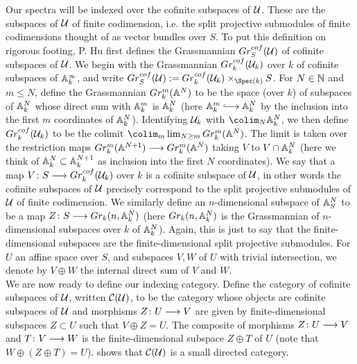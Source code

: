\documentclass{amsart}
\theoremstyle{definition}
\begin{document}
Our spectra will be indexed over the cofinite subspaces of ${\mathcal{U}}$. These are the subspaces of ${\mathcal{U}}$ of finite codimension, i.e. the split projective submodules of finite codimensions thought of as vector bundles over $S$. To put this definition on rigorous footing, P. Hu first defines the Grassmannian $Gr_{S}^{cof}({\mathcal{U}})$ of cofinite subspaces of ${\mathcal{U}}$. We begin with the Grassmannian $Gr_{k}^{cof}({\mathcal{U}}_{k})$ over $k$ of cofinite subspaces of $\mathbb{A}^{\infty}_{k}$, and write $Gr_{S}^{cof}(\oU) := Gr_{k}^{cof}(\oU_{k}) \times_{\Spec(k)} S$. For $N \in \mathbb{N}$ and $m \leq N$, define the Grassmannian $Gr_{k}^{m}(\mathbb{A}^N)$ to be the space (over $k$) of subspaces of $\mathbb{A}^N_k$ whose direct sum with $\mathbb{A}^m_k$ is $\mathbb{A}^N_k$ (here $\bA^m_k \monoto \bA^N_k$ by the inclusion into the first $m$ coordinates of $\mathbb{A}^N_k$). Identifying ${\mathcal{U}}_{k}$ with $\colim_N \bA^N_k$, we then define $Gr_{k}^{cof}({\mathcal{U}}_{k})$ to be the colimit $\colim_m \lim_{N \geq m} Gr_{k}^m(\bA^N)$. The limit is taken over the restriction maps $Gr_{k}^{m}(\mathbb{A}^{N+1}) \longrightarrow Gr_{k}^m (\mathbb{A}^N)$ taking $V$ to $V \cap \mathbb{A}^N_k$ (here we think of $\mathbb{A}^N_k \subset \mathbb{A}^{N+1}_k$ as inclusion into the first $N$ coordinates). We say that a map $V \colon S \longrightarrow Gr^{cof}_{k}({\mathcal{U}}_{k})$ over $k$ is a cofinite subspace of ${\mathcal{U}}$, in other words the cofinite subspaces of ${\mathcal{U}}$ precisely correspond to the split projective submodules of ${\mathcal{U}}$ of finite codimension. We similarly define an $n$-dimensional subspace of $\mathbb{A}^N_S$ to be a map $Z \colon S \longrightarrow Gr_{k}(n,\mathbb{A}^N_{k})$ (here $Gr_{k}(n,\mathbb{A}^N_{k})$ is the Grassmannian of $n$-dimensional subspaces over $k$ of $\mathbb{A}^N_{k}$). Again, this is just to say that the finite-dimensional subspaces are the finite-dimensional split projective submodules. For $U$ an affine space over $S$, and subspaces $V, W$ of $U$ with trivial intersection, we denote by $V \oplus W$ the internal direct sum of $V$ and $W$.\\

We are now ready to define our indexing category. Define the category of cofinite subspaces of ${\mathcal{U}}$, written ${\mathcal{C}}({\mathcal{U}})$, to be the category whose objects are cofinite subspaces of ${\mathcal{U}}$ and morphisms $Z \colon U \longrightarrow V$ are given by finite-dimensional subspaces $Z \subset U$ such that $V \oplus Z  = U$. The composite of morphisms $Z \colon U \longrightarrow V$ and $T \colon V \longrightarrow W$ is the finite-dimensional subspace $Z \oplus T$ of $U$ (note that $W \oplus (Z \oplus T) = U$). \cite[Lemma 2.3]{Hu03} shows that ${\mathcal{C}}({\mathcal{U}})$ is a small directed category.\\
\end{document}
